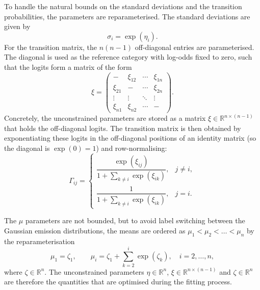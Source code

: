 To handle the natural bounds on the standard deviations and the transition probabilities,
the parameters are reparameterised. The standard deviations are given by
\begin{equation}
    \sigma_i = \exp(\eta_i).
    \label{eq:sigma-reparam}
\end{equation}
For the transition matrix, the $n(n-1)$ off-diagonal entries are parameterised. The diagonal
is used as the reference category with log-odds fixed to zero, such that the logits form a
matrix of the form
\begin{equation}
    \xi =
    \begin{pmatrix}
        -          & \xi_{12} & \cdots & \xi_{1n} \\
        \xi_{21}   & -        & \cdots & \xi_{2n} \\
        \vdots     & \vdots   & \ddots & \vdots   \\
        \xi_{n1}   & \xi_{n2} & \cdots & -
    \end{pmatrix}.
    \label{eq:xi-matrix}
\end{equation}
Concretely, the unconstrained parameters are stored as a matrix
$\xi \in \mathbb{R}^{n \times (n-1)}$ that holds the off-diagonal logits. The transition
matrix is then obtained by exponentiating these logits in the off-diagonal positions of an
identity matrix (so the diagonal is $\exp(0) = 1$) and row-normalising:
\begin{equation}
    \Gamma_{ij} =
    \begin{cases}
        \dfrac{\exp(\xi_{ij})}{1 + \sum_{k \neq i} \exp(\xi_{ik})}, & j \neq i, \\[2ex]
        \dfrac{1}{1 + \sum_{k \neq i} \exp(\xi_{ik})}, & j = i.
    \end{cases}
    \label{eq:gamma-reparam}
\end{equation}

The $\mu$ parameters are not bounded, but to avoid label switching between the Gaussian
emission distributions, the means are ordered as $\mu_1 < \mu_2 < \dots < \mu_n$ by the
reparameterisation
\begin{equation}
    \mu_1 = \zeta_1, \qquad
    \mu_i = \zeta_1 + \sum_{k=2}^{i} \exp(\zeta_k), \quad i = 2, \dots, n,
    \label{eq:mu-reparam}
\end{equation}
where $\zeta \in \mathbb{R}^{n}$. The unconstrained parameters $\eta \in \mathbb{R}^{n}$,
$\xi \in \mathbb{R}^{n \times (n-1)}$ and $\zeta \in \mathbb{R}^{n}$ are therefore the quantities
that are optimised during the fitting process.
